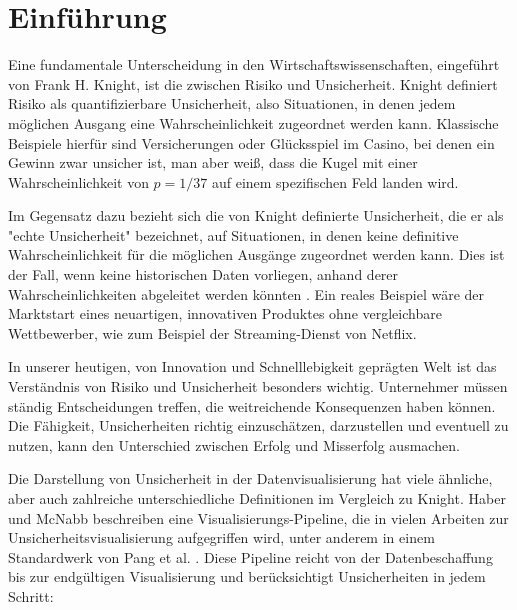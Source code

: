 \section{Einführung}

Eine fundamentale Unterscheidung in den Wirtschaftswissenschaften, eingeführt von Frank H. Knight, ist die zwischen Risiko und Unsicherheit. Knight definiert Risiko als quantifizierbare Unsicherheit, also Situationen, in denen jedem möglichen Ausgang eine Wahrscheinlichkeit zugeordnet werden kann. Klassische Beispiele hierfür sind Versicherungen oder Glücksspiel im Casino, bei denen ein Gewinn zwar unsicher ist, man aber weiß, dass die Kugel mit einer Wahrscheinlichkeit von \( p = 1/37 \) auf einem spezifischen Feld landen wird.

Im Gegensatz dazu bezieht sich die von Knight definierte Unsicherheit, die er als "echte Unsicherheit" bezeichnet, auf Situationen, in denen keine definitive Wahrscheinlichkeit für die möglichen Ausgänge zugeordnet werden kann. Dies ist der Fall, wenn keine historischen Daten vorliegen, anhand derer Wahrscheinlichkeiten abgeleitet werden könnten \cite{Knight1921}. Ein reales Beispiel wäre der Marktstart eines neuartigen, innovativen Produktes ohne vergleichbare Wettbewerber, wie zum Beispiel der Streaming-Dienst von Netflix.

In unserer heutigen, von Innovation und Schnelllebigkeit geprägten Welt ist das Verständnis von Risiko und Unsicherheit besonders wichtig. Unternehmer müssen ständig Entscheidungen treffen, die weitreichende Konsequenzen haben können. Die Fähigkeit, Unsicherheiten richtig einzuschätzen, darzustellen und eventuell zu nutzen, kann den Unterschied zwischen Erfolg und Misserfolg ausmachen.

Die Darstellung von Unsicherheit in der Datenvisualisierung hat viele ähnliche, aber auch zahlreiche unterschiedliche Definitionen im Vergleich zu Knight. Haber und McNabb \cite{Haber1990} beschreiben eine Visualisierungs-Pipeline, die in vielen Arbeiten zur Unsicherheitsvisualisierung aufgegriffen wird, unter anderem in einem Standardwerk von Pang et al. \cite{Pang1997}. Diese Pipeline reicht von der Datenbeschaffung bis zur endgültigen Visualisierung und berücksichtigt Unsicherheiten in jedem Schritt:

